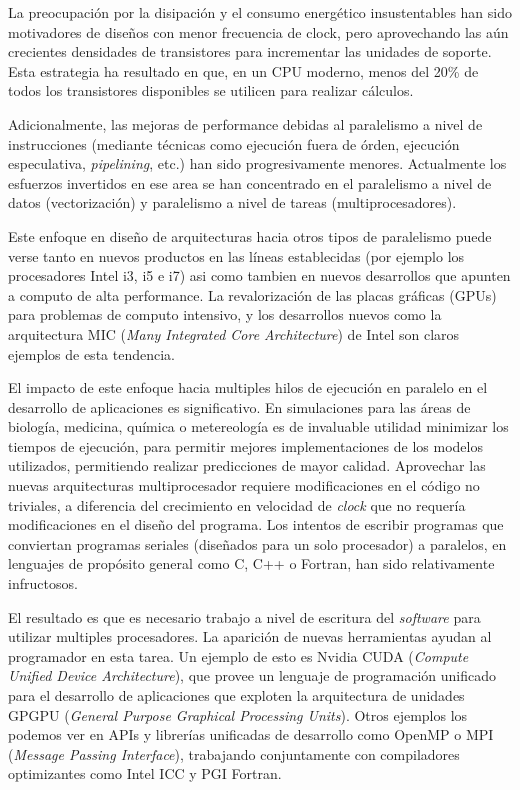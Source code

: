 La preocupaci\'on por la disipaci\'on y el consumo energ\'etico insustentables han sido motivadores
de dise\~nos con menor frecuencia de clock, pero aprovechando las a\'un crecientes densidades de
transistores para incrementar las unidades de soporte. Esta estrategia ha resultado en que, en un
CPU moderno, menos del 20\% de todos los transistores disponibles se utilicen para realizar c\'alculos.

Adicionalmente, las mejoras de performance debidas al paralelismo
a nivel de instrucciones (mediante t\'ecnicas como ejecuci\'on fuera de \'orden,
ejecuci\'on especulativa, \textit{pipelining}, etc.) han sido
progresivamente menores. Actualmente los esfuerzos invertidos en ese area se han concentrado en
el paralelismo a nivel de datos (vectorizaci\'on) y paralelismo a nivel de tareas (multiprocesadores).~\cite{HennessyPatterson}

Este enfoque en dise\~no de arquitecturas hacia otros tipos de paralelismo puede verse tanto
en nuevos productos en las l\'ineas establecidas (por ejemplo los procesadores Intel i3, i5 e i7)
asi como tambien en nuevos desarrollos que apunten a computo de alta performance.
La revalorizaci\'on de las placas gr\'aficas (GPUs) para problemas de computo intensivo, y los desarrollos
nuevos como la arquitectura MIC (\textit{Many Integrated Core Architecture}) de Intel son
claros ejemplos de esta tendencia.

El impacto de este enfoque hacia multiples hilos de ejecuci\'on en paralelo en el
desarrollo de aplicaciones es significativo. En simulaciones para las \'areas de biolog\'ia,
medicina, qu\'imica o metereolog\'ia es de invaluable utilidad minimizar los tiempos
de ejecuci\'on, para permitir mejores implementaciones de los modelos utilizados,
permitiendo realizar predicciones de mayor calidad. Aprovechar las nuevas
arquitecturas multiprocesador requiere modificaciones en el c\'odigo no triviales,
a diferencia del crecimiento en velocidad de \textit{clock} que no requer\'ia modificaciones
en el dise\~no del programa. Los intentos de escribir programas que conviertan
programas seriales (dise\~nados para un solo procesador) a paralelos, en lenguajes
de prop\'osito general como C, C++ o Fortran, han sido relativamente infructosos.

El resultado es que es necesario trabajo a nivel de escritura del \textit{software}
para utilizar multiples procesadores. La aparici\'on de nuevas herramientas ayudan
al programador en esta tarea. Un ejemplo de esto es Nvidia CUDA (\textit{Compute
Unified Device Architecture}), que provee un lenguaje de programaci\'on unificado
para el desarrollo de aplicaciones que exploten la arquitectura de unidades GPGPU
(\textit{General Purpose Graphical Processing Units}). Otros ejemplos los podemos
ver en APIs y librer\'ias unificadas de desarrollo como OpenMP o MPI
(\textit{Message Passing Interface}), trabajando conjuntamente con compiladores
optimizantes como Intel ICC y PGI Fortran.

